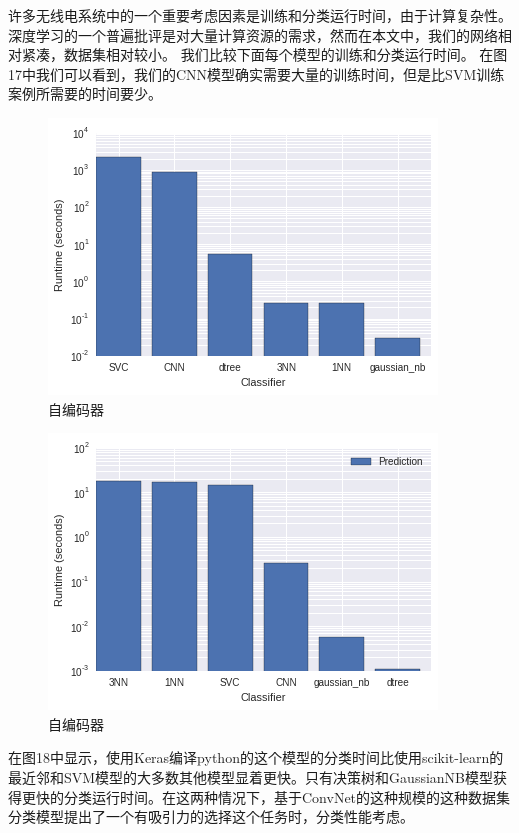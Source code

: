 许多无线电系统中的一个重要考虑因素是训练和分类运行时间，由于计算复杂性。 深度学习的一个普遍批评是对大量计算资源的需求，然而在本文中，我们的网络相对紧凑，数据集相对较小。 我们比较下面每个模型的训练和分类运行时间。 在图17中我们可以看到，我们的CNN模型确实需要大量的训练时间，但是比SVM训练案例所需要的时间要少。\par
\begin{figure}[!h]
	\centering
	\includegraphics[scale=0.5]{figures/chapter_3/train_time}
	\caption{自编码器}	\label{fig_3_2}
\end{figure}
\begin{figure}[!h]
	\centering
	\includegraphics[scale=0.5]{figures/chapter_3/classify_time}
	\caption{自编码器}	\label{fig_3_2}
\end{figure}

在图18中显示，使用Keras编译python的这个模型的分类时间比使用scikit-learn的最近邻和SVM模型的大多数其他模型显着更快。只有决策树和GaussianNB模型获得更快的分类运行时间。在这两种情况下，基于ConvNet的这种规模的这种数据集分类模型提出了一个有吸引力的选择这个任务时，分类性能考虑。\par


